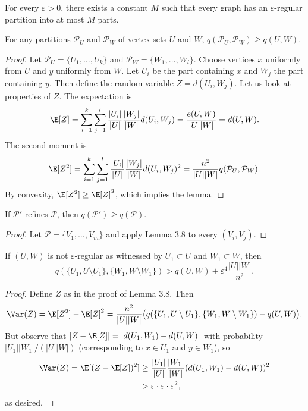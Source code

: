 \begin{theorem}
For every $\varepsilon>0$, there exists a constant $M$ such that every graph has an $\varepsilon$-regular partition into at most $M$ parts.
\end{theorem}
\begin{lemma}[3.8]
For any partitions $\mathcal P_U$ and $\mathcal P_W$ of vertex sets $U$ and $W$, $q(\mathcal P_U,\mathcal P_W)\geq q(U,W)$.
\end{lemma}
\begin{proof}
Let $\mathcal P_U=\{U_1,\ldots,U_k\}$ and $\mathcal P_W=\{W_1,\ldots,W_l\}$. Choose vertices $x$ uniformly from $U$ and $y$ uniformly from $W$. Let $U_i$ be the part containing $x$ and $W_j$ the part containing $y$. Then define the random variable $Z=d(U_i,W_j)$. Let us look at properties of $Z$. The expectation is
\[\E[Z]=\sum_{i=1}^k\sum_{j=1}^l\frac{|U_i|}{|U|}\frac{|W_j|}{|W|}d(U_i,W_j)=\frac{e(U,W)}{|U||W|}=d(U,W).\]
The second moment is
\[\E[Z^2]=\sum_{i=1}^k\sum_{j=1}^l\frac{|U_i|}{|U|}\frac{|W_j|}{|W|}d(U_i,W_j)^2=\frac{n^2}{|U||W|}q(\mathcal P_U,\mathcal P_W).\]
By convexity, $\E[Z^2]\geq\E[Z]^2$, which implies the lemma.
\end{proof}
\begin{lemma}[3.9]
If $\mathcal P'$ refines $\mathcal P$, then $q(\mathcal P')\geq q(\mathcal P)$.
\end{lemma}
\begin{proof}
Let $\mathcal P=\{V_1,\ldots,V_m\}$ and apply Lemma 3.8 to every $(V_i,V_j)$.
\end{proof}
\begin{lemma}
If $(U,W)$ is not $\varepsilon$-regular as witnessed by $U_1\subset U$ and $W_1\subset W$, then
\[q(\{U_1,U\setminus U_1\},\{W_1,W\setminus W_1\})>q(U,W)+\varepsilon^4\frac{|U||W|}{n^2}.\]
\end{lemma}
\begin{proof}
Define $Z$ as in the proof of Lemma 3.8. Then
\[\Var(Z)=\E[Z^2]-\E[Z]^2=\frac{n^2}{|U||W|}\big(q(\{U_1,U\setminus U_1\},\{W_1,W\setminus W_1\})-q(U,W)\big).\]
But observe that $|Z-\E[Z]|=|d(U_1,W_1)-d(U,W)|$ with probability $|U_1||W_1|/(|U||W|)$ (corresponding to $x\in U_1$ and $y\in W_1$), so
\[\begin{split}
\Var(Z)=\E[(Z-\E[Z])^2]&\geq\frac{|U_1|}{|U|}\frac{|W_1|}{|W|}(d(U_1,W_1)-d(U,W))^2\\
&>\varepsilon\cdot\varepsilon\cdot\varepsilon^2,
\end{split}\]
as desired.
\end{proof}

